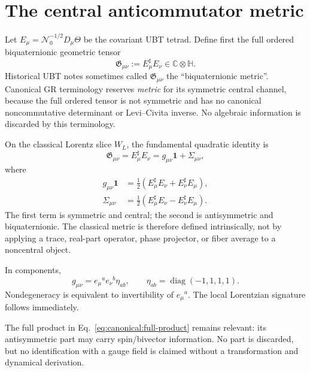 
\section{The central anticommutator metric}
\label{sec:canonical:biquaternion_metric}

Let $E_\mu=\mathcal N_0^{-1/2}D_\mu\Theta$ be the covariant UBT tetrad.  Define
first the full ordered biquaternionic geometric tensor
\begin{equation}
 \mathfrak G_{\mu\nu}:=E_\mu^\sharp E_\nu\in\mathbb C\otimes\mathbb H.
\end{equation}
Historical UBT notes sometimes called $\mathfrak G_{\mu\nu}$ the
``biquaternionic metric''.  Canonical GR terminology reserves \emph{metric} for
its symmetric central channel, because the full ordered tensor is not symmetric
and has no canonical noncommutative determinant or Levi--Civita inverse.  No
algebraic information is discarded by this terminology.

On the classical Lorentz slice $W_L$, the fundamental quadratic identity is
\begin{equation}
 \boxed{\mathfrak G_{\mu\nu}=E_\mu^\sharp E_\nu
       =g_{\mu\nu}\mathbf1+\Sigma_{\mu\nu},}
 \label{eq:canonical:full-product}
\end{equation}
where
\begin{align}
 g_{\mu\nu}\mathbf1
 &=\frac12(E_\mu^\sharp E_\nu+E_\nu^\sharp E_\mu),\\
 \Sigma_{\mu\nu}
 &=\frac12(E_\mu^\sharp E_\nu-E_\nu^\sharp E_\mu).
\end{align}
The first term is symmetric and central; the second is antisymmetric and
biquaternionic.  The classical metric is therefore defined intrinsically, not
by applying a trace, real-part operator, phase projector, or fiber average to a
noncentral object.

In components,
\begin{equation}
 g_{\mu\nu}=e_\mu{}^a e_\nu{}^b\eta_{ab},
 \qquad \eta_{ab}=\operatorname{diag}(-1,1,1,1).
\end{equation}
Nondegeneracy is equivalent to invertibility of $e_\mu{}^a$.  The local
Lorentzian signature follows immediately.

The full product in Eq.~\eqref{eq:canonical:full-product} remains relevant: its
antisymmetric part may carry spin/bivector information.  No part is discarded,
but no identification with a gauge field is claimed without a transformation
and dynamical derivation.
